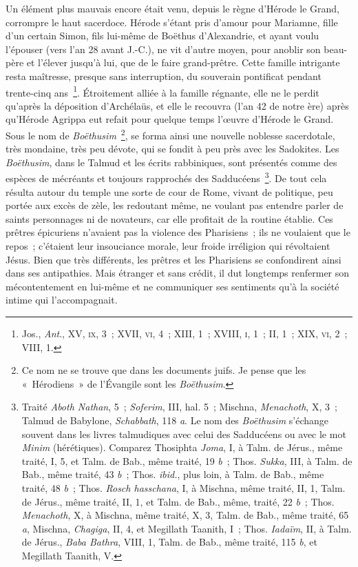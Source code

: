 \documentclass[french,twoside]{book} %
\begin{document}
Un élément plus mauvais encore était venu, depuis le règne d’Hérode le Grand, corrompre le haut sacerdoce. Hérode s’étant pris d’amour pour Mariamne, fille d’un certain Simon, fils lui-même de Boëthus d’Alexandrie, et ayant voulu l’épouser (vers l’an 28 avant J.-C.), ne vit d’autre moyen, pour anoblir son beau-père et l’élever jusqu’à lui, que de le faire grand-prêtre. Cette famille intrigante resta maîtresse, presque sans interruption, du souverain pontificat pendant trente-cinq ans \footnote{ Jos., {\itshape Ant}., XV, \textsc{ix}, 3 ; XVII, \textsc{vi}, 4 ; XIII, 1 ; XVIII, \textsc{i}, 1 ; II, 1 ; XIX, \textsc{vi}, 2 ; VIII, 1.}. Étroitement alliée à la famille régnante, elle ne le perdit qu’après la déposition d’Archélaüs, et elle le recouvra (l’an 42 de notre ère) après qu’Hérode Agrippa eut refait pour quelque temps l’œuvre d’Hérode le Grand. Sous le nom de {\itshape Boëthusim} \footnote{ Ce nom ne se trouve que dans les documents juifs. Je pense que les « Hérodiens » de l’Évangile sont les {\itshape Boëthusim}.}, se forma ainsi une nouvelle noblesse sacerdotale, très mondaine, très peu dévote, qui se fondit à peu près avec les Sadokites. Les {\itshape Boëthusim}, dans le Talmud et les écrits rabbiniques, sont présentés comme des espèces de mécréants et toujours rapprochés des Sadducéens \footnote{ Traité {\itshape Aboth Nathan}, 5 ; {\itshape Soferim}, III, hal. 5 ; Mischna, {\itshape Menachoth}, X, 3 ; Talmud de Babylone, {\itshape Schabbath}, 118 {\itshape a}. Le nom des {\itshape Boëthusim} s’échange souvent dans les livres talmudiques avec celui des Sadducéens ou avec le mot {\itshape Minim} (hérétiques). Comparez Thosiphta {\itshape Joma}, I, à Talm. de Jérus., même traité, I, 5, et Talm. de Bab., même traité, 19 {\itshape b} ; Thos. {\itshape Sukka}, III, à Talm. de Bab., même traité, 43 {\itshape b} ; Thos. {\itshape ibid.}, plus loin, à Talm. de Bab., même traité, 48 {\itshape b} ; Thos. {\itshape Rosch hasschana}, I, à Mischna, même traité, II, 1, Talm. de Jérus., même traité, II, 1, et Talm. de Bab., même, traité, 22 {\itshape b} ; Thos. {\itshape Menachoth}, X, à Mischna, même traité, X, 3, Talm. de Bab., même traité, 65 {\itshape a}, Mischna, {\itshape Chagiga}, II, 4, et Megillath Taanith, I ; Thos. {\itshape Iadaïm}, II, à Talm. de Jérus., {\itshape Baba Bathra}, VIII, 1, Talm. de Bab., même traité, 115 {\itshape b}, et Megillath Taanith, V.}. De tout cela résulta autour du temple une sorte de cour de Rome, vivant de politique, peu portée aux excès de zèle, les redoutant même, ne voulant pas entendre parler de saints personnages ni de novateurs, car elle profitait de la routine établie. Ces prêtres épicuriens n’avaient pas la violence des Pharisiens ; ils ne voulaient que le repos ; c’étaient leur insouciance morale, leur froide irréligion qui révoltaient Jésus. Bien que très différents, les prêtres et les Pharisiens se confondirent ainsi dans ses antipathies. Mais étranger et sans crédit, il dut longtemps renfermer son mécontentement en lui-même et ne communiquer ses sentiments qu’à la société intime qui l’accompagnait.\par
\end{document}
